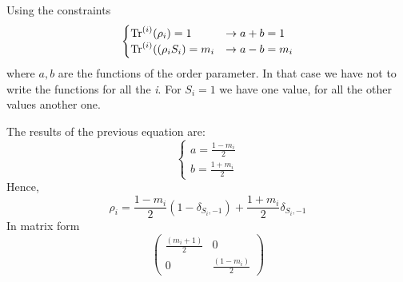 \documentclass[../main/main.tex]{subfiles}
\begin{document}

Using the constraints
\begin{equation}
  \begin{cases}
    \Tr^{(i)}(\rho _i) = 1  &\rightarrow  a+b=1\\
    \Tr^{(i)}((\rho _i S_i) = m_i  & \rightarrow a-b = m_i
  \end{cases}
\end{equation}
where \( a,b \) are the functions of the order parameter.
In that case we have not to write the functions for all the \emph{i}. For \( S_i = 1 \) we have one value, for all the other values another one.

The results of the previous equation are:
\begin{equation}
  \begin{cases}
   a = \frac{1-m_i}{2} \\
   b = \frac{1+m_i}{2}
  \end{cases}
\end{equation}
Hence,
\begin{equation}
  \rho _i =   \frac{1-m_i}{2}  (1- \delta _{S_i,-1}) + \frac{1+m_i}{2} \delta _{S_i,-1}
\end{equation}
In matrix form
\begin{equation}
\begin{pmatrix}
\frac{(m_i+1)}{2}   & 0 \\
  0 &    \frac{(1-m_i)}{2}
\end{pmatrix}
\end{equation}
\end{document}
